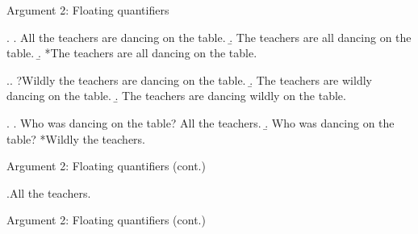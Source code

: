 \documentclass[ignorenonframetext,8pt,aspectratio=169]{beamer}
\begin{document}
\begin{frame}[t,plain]{Argument 2: Floating quantifiers}
\bigskip

		\ex. 
		\a. All the teachers are dancing on the table.
		\b. The teachers are all dancing on the table.
		\b. *The teachers are all dancing on the table.

\bigskip

		\ex.\a. ?Wildly the teachers are dancing on the table.
		\b. The teachers are wildly dancing on the table.
		\b. The teachers are  dancing wildly on the table.

\bigskip

		\ex. \a. Who was dancing on the table? All the teachers.
		\b. Who was dancing on the table? *Wildly the teachers.

\end{frame}

\begin{frame}[t,plain]{Argument 2: Floating quantifiers (cont.)}

\bigskip

\ex.All the teachers.

\begin{center}
\end{center}
\end{frame}

\begin{frame}[t,plain]{Argument 2: Floating quantifiers (cont.)}

\vspace{90pt}
\begin{center}

{\small

}
		\end{center}
\end{frame}
\end{document}
